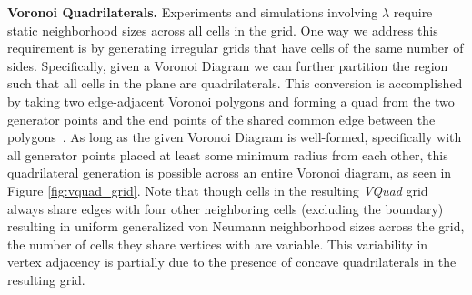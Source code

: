 \documentclass[a4paper,11pt]{article}
\begin{document}
\medskip

\noindent \textbf{Voronoi Quadrilaterals.} Experiments and simulations involving $\lambda$ require static neighborhood sizes across all cells in the grid. One way we address this requirement is by generating irregular grids that have cells of the same number of sides. Specifically, given a Voronoi Diagram we can further partition the region such that all cells in the plane are quadrilaterals. This conversion is accomplished by taking two edge-adjacent Voronoi polygons and forming a quad from the two generator points and the end points of the shared common edge between the polygons~\cite{am10}. As long as the given Voronoi Diagram is well-formed, specifically with all generator points placed at least some minimum radius from each other, this quadrilateral generation is possible across an entire Voronoi diagram, as seen in Figure \ref{fig:vquad_grid}. Note that though cells in the resulting \textit{VQuad} grid always share edges with four other neighboring cells (excluding the boundary) resulting in uniform generalized von Neumann neighborhood sizes across the grid, the number of cells they share vertices with are variable. This variability in vertex adjacency is partially due to the presence of concave quadrilaterals in the resulting grid. %
%
\end{document}
